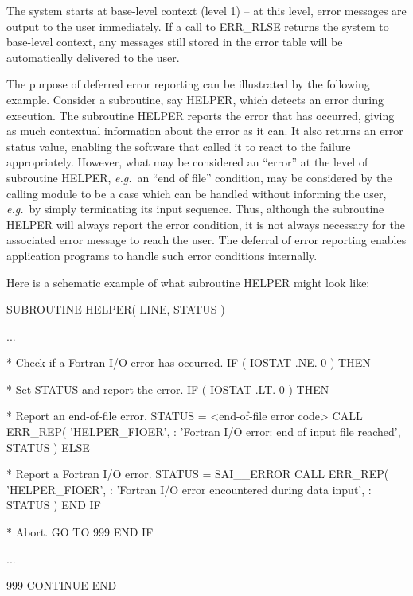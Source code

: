 \documentclass[twoside,11pt]{starlink}
\begin{document}
The system starts at base-level context (level 1) -- at this level, error
messages are output to the user immediately.
If a call to ERR\_RLSE returns the system to base-level context, any messages
still stored in the error table will be automatically delivered to the user.

The purpose of deferred error reporting can be illustrated by the following
example.
Consider a subroutine, say HELPER, which detects an error during execution.
The subroutine HELPER reports the error that has occurred, giving as much
contextual information about the error as it can.
It also returns an error status value, enabling the software that called it
to react to the failure appropriately.
However, what may be considered an ``error'' at the level of subroutine
HELPER, \textit{e.g.}\ an ``end of file'' condition, may be considered by the
calling module to be a case which can be handled without informing the user,
\textit{e.g.}\ by simply terminating its input sequence.
Thus, although the subroutine HELPER will always report the error condition,
it is not always necessary for the associated error message to reach the
user.
The deferral of error reporting enables application programs to handle such
error conditions internally.

Here is a schematic example of what subroutine HELPER might look like:

\begin {small}
\begin{terminalv}
      SUBROUTINE HELPER( LINE, STATUS )

      ...

*  Check if a Fortran I/O error has occurred.
      IF ( IOSTAT .NE. 0 ) THEN

*     Set STATUS and report the error.
         IF ( IOSTAT .LT. 0 ) THEN

*        Report an end-of-file error.
            STATUS = <end-of-file error code>
            CALL ERR_REP( 'HELPER_FIOER',
     :         'Fortran I/O error: end of input file reached', STATUS )
         ELSE

*        Report a Fortran I/O error.
            STATUS = SAI__ERROR
            CALL ERR_REP( 'HELPER_FIOER',
     :         'Fortran I/O error encountered during data input',
     :         STATUS )
         END IF

*     Abort.
         GO TO 999
      END IF

      ...

 999  CONTINUE
      END
\end{terminalv}
\end {small}
\end{document}
